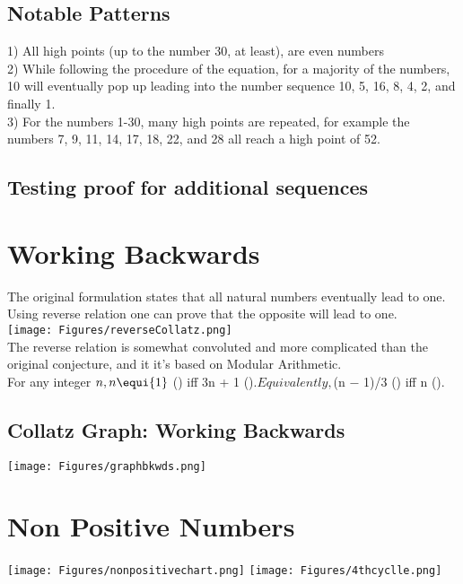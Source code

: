 \documentclass[10pt,english, openany]{book}
\begin{document}
\subsection{Notable Patterns}
1) All high points (up to the number 30, at least), are even numbers\\
2) While following the procedure of the equation, for a majority of the numbers, 10 will
eventually pop up leading into the number sequence 10, 5, 16, 8, 4, 2, and finally 1.\\
3) For the numbers 1-30, many high points are repeated, for example the numbers 7, 9, 11, 14, 17, 18, 22, and 28 all reach a high point of 52.\\
\subsection{Testing proof for additional sequences}
\section{Working Backwards}
The original formulation states that all natural numbers eventually lead to one.  Using reverse relation one can prove that the opposite will lead to one.\\
\texttt{[image: Figures/reverseCollatz.png]}\\


The reverse relation is somewhat convoluted and more complicated than the original conjecture, and it it’s based on Modular Arithmetic.\\

For any integer $n, n \equi{1}$ () iff 3n + 1  ()$. Equivalently, $(n − 1)/3  () iff n  ().\\

\subsection{Collatz Graph: Working Backwards}
\texttt{[image: Figures/graphbkwds.png]}


\section{Non Positive Numbers}
\texttt{[image: Figures/nonpositivechart.png]}
\clearpage
\texttt{[image: Figures/4thcyclle.png]}

\end{document}
